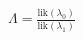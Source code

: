 \documentclass[preview]{standalone}
\begin{document}
\begin{align*}
\Lambda = \frac{\text{lik}(\lambda_0)}{\text{lik}(\lambda_1)}
\end{align*}
\end{document}
